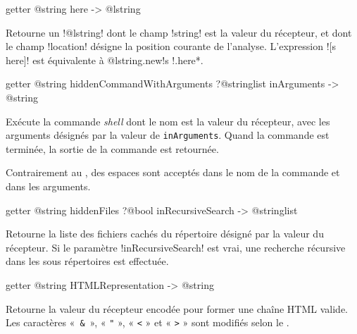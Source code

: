 
\begin{galgasbox}
getter @string here -> @lstring
\end{galgasbox}

Retourne un \ggs!@lstring! dont le champ \ggs!string! est la valeur du récepteur, et dont le champ \ggs!location! désigne la position courante de l'analyse. L'expression \ggs![s here]! est équivalente à \ggs*@lstring.new{!s !.here}*.













\begin{galgasbox}
getter @string hiddenCommandWithArguments ?@stringlist inArguments -> @string
\end{galgasbox}
Exécute la commande \emph{shell} dont le nom est la valeur du récepteur, avec les arguments désignés par la valeur de \texttt{inArguments}. Quand la commande est terminée, la sortie de la commande est retournée.

Contrairement au , des espaces sont acceptés dans le nom de la commande et dans les arguments.









\begin{galgasbox}
getter @string hiddenFiles ?@bool inRecursiveSearch -> @stringlist
\end{galgasbox}

Retourne la liste des fichiers cachés du répertoire désigné par la valeur du récepteur. Si le paramètre \ggs!inRecursiveSearch! est vrai, une recherche récursive dans les sous répertoires est effectuée.











\begin{galgasbox}
getter @string HTMLRepresentation -> @string
\end{galgasbox}
Retourne la valeur du récepteur encodée pour former une chaîne HTML valide. Les caractères «~\texttt{\&}~», « \texttt{"} », « \texttt{<} » et « \texttt{>} » sont modifiés selon le .


